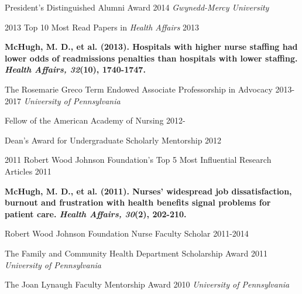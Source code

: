 \documentclass[10pt,]{article}
\begin{document}
{{{{{{President's Distinguished Alumni Award \hfill 2014 \newline
\hspace*{0.5cm} {\textit {Gwynedd-Mercy University}}

2013	Top 10 Most Read Papers in {\textit {Health Affairs}} \hfill 2013
\vspace{-2.5mm}
\begin{adjustwidth}{1cm}{1cm}
{\footnotesize {\textbf {McHugh, M. D., et al. (2013). Hospitals with higher nurse staffing had lower odds of readmissions penalties than hospitals with lower staffing. {\textit {Health Affairs, 32}}(10), 1740-1747.}}}
\end{adjustwidth}

The Rosemarie Greco Term Endowed Associate Professorship in Advocacy \hfill 2013-2017 \newline
\hspace*{0.5cm} {\textit {University of Pennsylvania}}

Fellow of the American Academy of Nursing \hfill {2012-{\small{}}}

Dean’s Award for Undergraduate Scholarly Mentorship \hfill 2012	

2011 Robert Wood Johnson Foundation’s Top 5 Most Influential Research Articles \hfill 2011 
\vspace{-2.5mm}
\begin{adjustwidth}{1cm}{1cm}
{\footnotesize {\textbf {McHugh, M. D., et al. (2011). Nurses’ widespread job dissatisfaction, burnout and frustration with health benefits signal problems for patient care. {\textit {Health Affairs, 30}}(2), 202-210.}}}
\end{adjustwidth}

Robert Wood Johnson Foundation Nurse Faculty Scholar \hfill 2011-2014	

The Family and Community Health Department Scholarship Award \hfill 2011 \newline
\hspace*{0.5cm} {\textit {University of Pennsylvania}}

The Joan Lynaugh Faculty Mentorship Award \hfill 2010 \newline
\hspace*{0.5cm} {\textit {University of Pennsylvania}}

\section{\Large {}} 

}}}}}}
\end{document}
